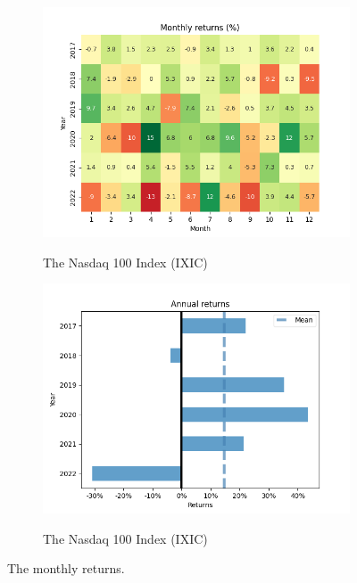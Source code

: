 \documentclass[../xlapes02]{subfiles}
\begin{document}
\begin{figure}
        \vspace{0.5cm}

        \begin{subfigure}[t]{\experimentimgwidth\textwidth}
            \centering
            \includegraphics[width=\linewidth]{image/figure/monthly_returns_heatmap_ixic}
            \label{subfig:montly_returns_heatmap_ixic}
            \caption{The Nasdaq 100 Index (IXIC)}
        \end{subfigure}
        \hfill
        \begin{subfigure}[t]{\experimentimgwidth\textwidth}
            \centering
            \includegraphics[width=\linewidth]{image/figure/annual_returns_ixic}
            \label{subfig:annual_returns_ixic}
            \caption{The Nasdaq 100 Index (IXIC)}
        \end{subfigure}

        \caption{The monthly returns.}
        \label{fig:month_annual_returns}
    \end{figure}
\end{document}
